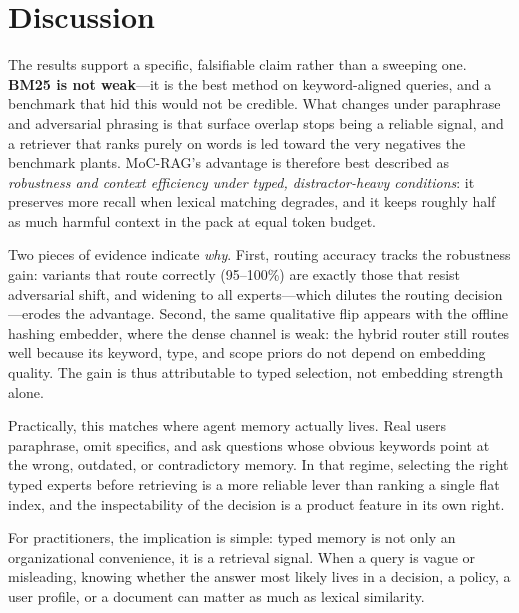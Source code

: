 \section{Discussion}

The results support a specific, falsifiable claim rather than a sweeping one.
\textbf{BM25 is not weak}---it is the best method on keyword-aligned queries, and
a benchmark that hid this would not be credible. What changes under paraphrase
and adversarial phrasing is that surface overlap stops being a reliable signal,
and a retriever that ranks purely on words is led toward the very negatives the
benchmark plants. MoC-RAG's advantage is therefore best described as
\emph{robustness and context efficiency under typed, distractor-heavy
conditions}: it preserves more recall when lexical matching degrades, and it
keeps roughly half as much harmful context in the pack at equal token budget.

Two pieces of evidence indicate \emph{why}. First, routing accuracy tracks the
robustness gain: variants that route correctly (95--100\%) are exactly those that
resist adversarial shift, and widening to all experts---which dilutes the
routing decision---erodes the advantage. Second, the same qualitative flip
appears with the offline hashing embedder, where the dense channel is weak: the
hybrid router still routes well because its keyword, type, and scope priors do
not depend on embedding quality. The gain is thus attributable to typed
selection, not embedding strength alone.

Practically, this matches where agent memory actually lives. Real users
paraphrase, omit specifics, and ask questions whose obvious keywords point at the
wrong, outdated, or contradictory memory. In that regime, selecting the right
typed experts before retrieving is a more reliable lever than ranking a single
flat index, and the inspectability of the decision is a product feature in its
own right.

For practitioners, the implication is simple: typed memory is not only an
organizational convenience, it is a retrieval signal. When a query is vague or
misleading, knowing whether the answer most likely lives in a decision, a policy,
a user profile, or a document can matter as much as lexical similarity.
